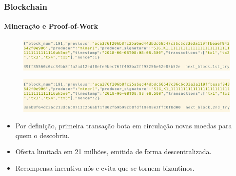 \documentclass[11pt, red]{beamer}
\begin{document}
\begin{frame}
    \frametitle{Blockchain}
    \framesubtitle{Minera\c{c}\~ao e Proof-of-Work}
    \begin{figure}[htb]
        \begin{center}
            \includegraphics[width=0.8\linewidth]{fig/btc3.png}
        \end{center}
    \end{figure}
    \begin{figure}[htb]
        \begin{center}
            \includegraphics[width=0.8\linewidth]{fig/btc4.png}
        \end{center}
    \end{figure}
    \begin{beamerboxesrounded}[lower=fundocinza,shadow=true]{}
        \begin{itemize}
        	\item Por defini\c{c}\~ao, primeira transa\c{c}\~ao bota em circula\c{c}\~ao novas moedas para quem o descobriu.
        	\item Oferta limitada em 21 milh\~oes, emitida de forma descentralizada.
        	\item Recompensa incentiva n\'os e evita que se tornem bizantinos.
        \end{itemize}
    \end{beamerboxesrounded}
\end{frame}
\end{document}
